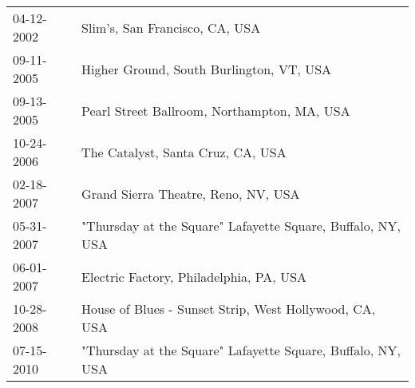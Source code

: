\begin{supertabular}{ll}
 04-12-2002 &                               Slim's, San Francisco, CA, USA \\
 09-11-2005 &                     Higher Ground, South Burlington, VT, USA \\
 09-13-2005 &                  Pearl Street Ballroom, Northampton, MA, USA \\
 10-24-2006 &                            The Catalyst, Santa Cruz, CA, USA \\
 02-18-2007 &                          Grand Sierra Theatre, Reno, NV, USA \\
 05-31-2007 &  "Thursday at the Square" Lafayette Square, Buffalo, NY, USA \\
 06-01-2007 &                      Electric Factory, Philadelphia, PA, USA \\
 10-28-2008 &       House of Blues - Sunset Strip, West Hollywood, CA, USA \\
 07-15-2010 &  "Thursday at the Square" Lafayette Square, Buffalo, NY, USA \\
\end{supertabular}
